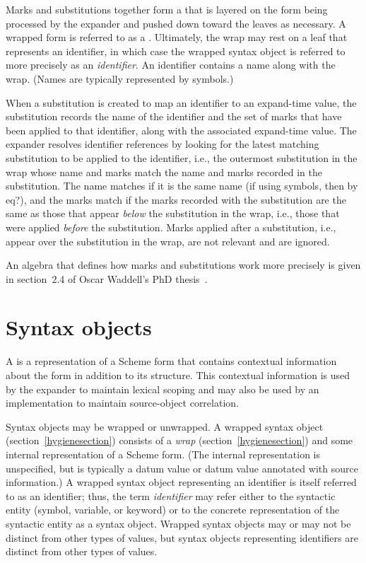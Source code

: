 Marks and substitutions together form a  that is layered on the
form being processed by the expander and pushed down toward the leaves as
necessary.
A wrapped form is referred to as a .
Ultimately, the wrap may rest on a leaf that represents an identifier, in
which case the wrapped syntax object is referred to more precisely
as an \emph{identifier}.
An identifier contains a name along with the wrap.
(Names are typically represented by symbols.)

When a substitution is created to map an identifier to an expand-time
value, the substitution records the name of the identifier and
the set of marks that have been applied to that identifier, along
with the associated expand-time value.
The expander resolves identifier references by looking for the latest
matching substitution to be applied to the identifier, i.e., the outermost
substitution in the wrap whose name and marks match the name and
marks recorded in the substitution.
The name matches if it is the same name (if using symbols, then by
{\cf eq?}), and the marks match if the marks recorded with the
substitution are the same as those that appear \emph{below} the
substitution in the wrap, i.e., those that were applied \emph{before} the
substitution.
Marks applied after a substitution, i.e., appear over the substitution in
the wrap, are not relevant and are ignored.

An algebra that defines how marks and substitutions work more precisely is
given in section~2.4 of Oscar Waddell's PhD thesis~\cite{Waddellphd}.

\section{Syntax objects}
\label{syntaxobjectssection}

A  is a representation of a Scheme form that contains
contextual information about the form in addition to its structure.
This contextual information is used by the expander to maintain
lexical scoping and may also be used by an implementation to maintain
source-object correlation.

Syntax objects may be wrapped or unwrapped.
A wrapped syntax object (section~\ref{hygienesection}) consists of a
\textit{wrap} (section~\ref{hygienesection}) and some internal representation
of a Scheme form.
(The internal representation is unspecified, but is typically a 
datum value or datum value annotated with source information.)
A wrapped syntax object representing an identifier is itself referred to as
an identifier; thus, the term \textit{identifier} may refer either to
the syntactic entity (symbol, variable, or keyword) or to the
concrete representation of the syntactic entity as a syntax object.
Wrapped syntax objects may or may not be distinct from other types of values,
but syntax objects representing identifiers are distinct
from other types of values.

